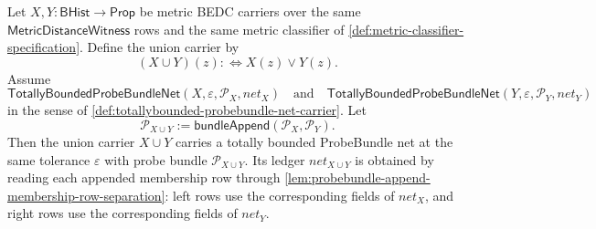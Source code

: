 \begin{theorem}
\label{thm:totallybounded-probebundle-net-finite-union}
Let $X,Y:\mathsf{BHist}\to\mathsf{Prop}$ be metric BEDC carriers over the same $\mathsf{MetricDistanceWitness}$ rows and the same metric classifier of \autoref{def:metric-classifier-specification}. Define the union carrier by
$$
(X\cup Y)(z):\Longleftrightarrow X(z)\vee Y(z).
$$
Assume
$$
\mathsf{TotallyBoundedProbeBundleNet}(X,\varepsilon,\mathcal{P}_X,net_X)
\quad\text{and}\quad
\mathsf{TotallyBoundedProbeBundleNet}(Y,\varepsilon,\mathcal{P}_Y,net_Y)
$$
in the sense of \autoref{def:totallybounded-probebundle-net-carrier}. Let
$$
\mathcal{P}_{X\cup Y}:=\mathsf{bundleAppend}(\mathcal{P}_X,\mathcal{P}_Y).
$$
Then the union carrier $X\cup Y$ carries a totally bounded ProbeBundle net at the same tolerance $\varepsilon$ with probe bundle $\mathcal{P}_{X\cup Y}$. Its ledger $net_{X\cup Y}$ is obtained by reading each appended membership row through \autoref{lem:probebundle-append-membership-row-separation}: left rows use the corresponding fields of $net_X$, and right rows use the corresponding fields of $net_Y$.
\end{theorem}
